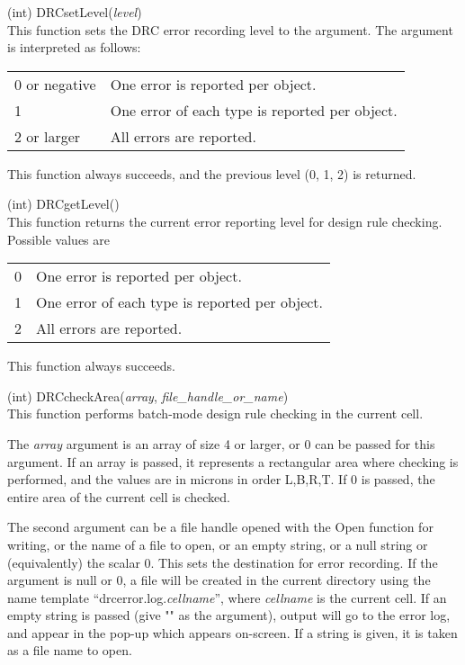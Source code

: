 \begin{description}
\item{(int) \vt DRCsetLevel({\it level\/})}\\
This function sets the DRC error recording level to the argument.  The
argument is interpreted as follows:

\begin{tabular}{ll}
0 or negative & One error is reported per object.\\
1             & One error of each type is reported per object.\\
2 or larger   & All errors are reported.\\
\end{tabular}

This function always succeeds, and the previous level (0, 1, 2) is
returned.

\item{(int) \vt DRCgetLevel()}\\
This function returns the current error reporting level for design
rule checking.  Possible values are

\begin{tabular}{ll}
0 & One error is reported per object.\\
1 & One error of each type is reported per object.\\
2 & All errors are reported.\\
\end{tabular}

This function always succeeds.

\item{(int) \vt DRCcheckArea({\it array\/}, {\it file\_handle\_or\_name\/})}\\
This function performs batch-mode design rule checking in the current
cell.

The {\it array} argument is an array of size 4 or larger, or 0 can be
passed for this argument.  If an array is passed, it represents a
rectangular area where checking is performed, and the values are in
microns in order L,B,R,T.  If 0 is passed, the entire area of the
current cell is checked.

The second argument can be a file handle opened with the {\vt Open}
function for writing, or the name of a file to open, or an empty
string, or a null string or (equivalently) the scalar 0.  This sets
the destination for error recording.  If the argument is null or 0, a
file will be created in the current directory using the name template
``{\vt drcerror.log.}{\it cellname\/}'', where {\it cellname} is the
current cell.  If an empty string is passed (give {\vt ""} as the
argument), output will go to the error log, and appear in the pop-up
which appears on-screen.  If a string is given, it is taken as a file
name to open.


\end{description}
